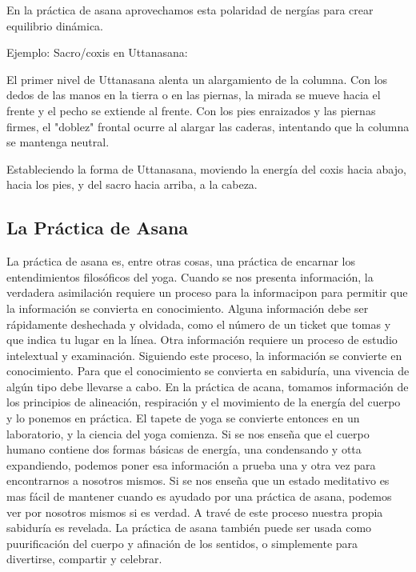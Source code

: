 En la práctica de asana aprovechamos esta polaridad de nergías para crear equilibrio dinámica.

Ejemplo: Sacro/coxis en Uttanasana:

El primer nivel de Uttanasana alenta un alargamiento de la columna. Con los dedos de las manos en la tierra o en las piernas, la mirada se mueve hacia el frente y el pecho se extiende al frente. Con los pies enraizados y las piernas firmes, el "doblez" frontal ocurre al alargar las caderas, intentando que la columna se mantenga neutral.

Estableciendo la forma de Uttanasana, moviendo la energía del coxis hacia abajo, hacia los pies, y del sacro hacia arriba, a la cabeza.

\subsection{La Práctica de Asana}
La práctica de asana es, entre otras cosas, una práctica de encarnar los entendimientos filosóficos del yoga. Cuando se nos presenta información, la verdadera asimilación requiere un proceso para la informacipon para permitir que la información se convierta en conocimiento. Alguna información debe ser rápidamente deshechada y olvidada, como el número de un ticket que tomas y que indica tu lugar en la línea. Otra información requiere un proceso de estudio intelextual y examinación. Siguiendo este proceso, la información se convierte en conocimiento. Para que el conocimiento se convierta en sabiduría, una vivencia de algún tipo debe llevarse a cabo. En la práctica de acana, tomamos información de los principios de alineación, respiración y el movimiento de la energía del cuerpo y lo ponemos en práctica. El tapete de yoga se convierte entonces en un laboratorio, y la ciencia del yoga comienza. Si se nos enseña que el cuerpo humano contiene dos formas básicas de energía, una condensando y otta expandiendo, podemos poner esa información a prueba una y otra vez para encontrarnos a nosotros mismos. Si se nos enseña que un estado meditativo es mas fácil de mantener cuando es ayudado por una práctica de asana, podemos ver por nosotros mismos si es verdad. A travé de este proceso nuestra propia sabiduría es revelada. La práctica de asana también puede ser usada como puurificación del cuerpo y afinación de los sentidos, o simplemente para divertirse, compartir y celebrar.

